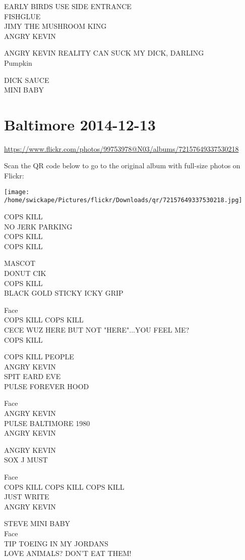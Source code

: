 \documentclass[10pt,letterpaper]{article}
\begin{document}
EARLY BIRDS USE SIDE ENTRANCE\\
FISHGLUE\\
JIMY THE MUSHROOM KING\\
ANGRY KEVIN

ANGRY KEVIN REALITY CAN SUCK MY DICK, DARLING\\
Pumpkin

DICK SAUCE\\
MINI BABY
\pagebreak

\section*{Baltimore 2014-12-13}

\url{https://www.flickr.com/photos/99753978@N03/albums/72157649337530218}

Scan the QR code below to go to the original album with full-size photos on Flickr:

\texttt{[image: /home/swickape/Pictures/flickr/Downloads/qr/72157649337530218.jpg]}
\pagebreak

COPS KILL\\
NO JERK PARKING\\
COPS KILL\\
COPS KILL

MASCOT\\
DONUT CIK\\
COPS KILL\\
BLACK GOLD STICKY ICKY GRIP

Face\\
COPS KILL COPS KILL\\
CECE WUZ HERE BUT NOT "HERE"...YOU FEEL ME?\\
COPS KILL

COPS KILL PEOPLE\\
ANGRY KEVIN\\
SPIT EARD EVE\\
PULSE FOREVER HOOD

Face\\
ANGRY KEVIN\\
PULSE BALTIMORE 1980\\
ANGRY KEVIN

ANGRY KEVIN\\
SOX J MUST

Face\\
COPS KILL COPS KILL COPS KILL\\
JUST WRITE\\
ANGRY KEVIN

STEVE MINI BABY\\
Face\\
TIP TOEING IN MY JORDANS\\
LOVE ANIMALS?  DON'T EAT THEM!
\end{document}
